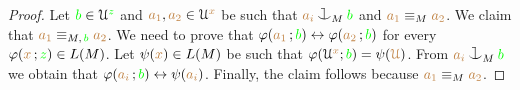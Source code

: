 \begin{proof}
Let ${\gr b}\in\U^{\gr z}$ and ${\mr a_1},{\mr a_2}\in\U^{\mr x}$ be such that ${\mr a_i}\cnonfork_M{\gr b}$ and ${\mr a_1}\equiv_M{\mr a_2}$.
We claim that ${\mr a_1}\equiv_{M,\,{\gr b}}{\mr a_2}$.
We need to prove that $\phi({\mr a_1}\,;{\gr b})\iff\phi({\mr a_2}\,;{\gr b})$ for every  $\phi({\mr x}\,;{\gr z})\in L(M)$.
Let $\psi({\mr x})\in L(M)$ be such that $\phi(\U^{\mr x};{\gr b})=\psi({\mr \U})$.
From ${\mr a_i}\cnonfork_M{\gr b}$ we obtain that  $\phi({\mr a_i}\,;{\gr b})\iff\psi({\mr a_i})$.
Finally, the claim follows because ${\mr a_1}\equiv_M{\mr a_2}$.
\end{proof}



% 



